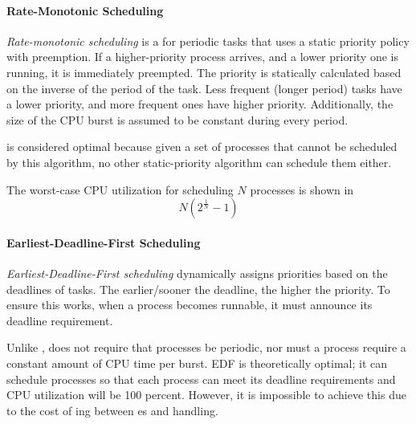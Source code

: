 \paragraph{Rate-Monotonic Scheduling}\label{par:Rate_Monotonic_Scheduling}
\begin{definition}\label{def:Rate_Monotonic_Scheduling}
  \emph{Rate-monotonic scheduling} is a  for periodic tasks that uses a static priority policy with preemption.
  If a higher-priority process arrives, and a lower priority one is running, it is immediately preempted.
  The priority is statically calculated based on the inverse of the period of the task.
  Less frequent (longer period) tasks have a lower priority, and more frequent ones have higher priority.
  Additionally, the size of the CPU burst is assumed to be constant during every period.
\end{definition}

 is considered optimal because given a set of processes that cannot be scheduled by this algorithm, no other static-priority algorithm can schedule them either.

The worst-case CPU utilization for scheduling $N$ processes is shown in 
\begin{equation}\label{eq:Rate_Monotonic_Worst_Case}
  N \left( 2^{\frac{1}{N}} -1 \right)
\end{equation}

\paragraph{Earliest-Deadline-First Scheduling}\label{par:Earliest_Deadline_First_Scheduling}
\begin{definition}\label{def:Earliest_Deadline_First_Scheduling}
  \emph{Earliest-Deadline-First scheduling} dynamically assigns priorities based on the deadlines of tasks.
  The earlier/sooner the deadline, the higher the priority.
  To ensure this works, when a process becomes runnable, it must announce its deadline requirement.
\end{definition}

Unlike ,  does not require that processes be periodic, nor must a process require a constant amount of CPU time per burst.
EDF is theoretically optimal; it can schedule processes so that each process can meet its deadline requirements and CPU utilization will be 100 percent.
However, it is impossible to achieve this due to the cost of ing between es and  handling.

